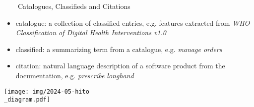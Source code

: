 \documentclass[aspectratio=1610,12pt]{beamer}
\newcommand{\imageslide}[4][]
{
\newgeometry{margin=0cm,top=1em}
\begin{frame}[plain]{~~~~#2}
\vspace{0.2em}
\centering\texttt{[image: \#3]}
\\#1
\note{#4}
\end{frame}
\restoregeometry
}
\begin{document}
{
\begin{frame}[plain]{~~~~Catalogues, Classifieds and Citations}
\begin{itemize}
\item catalogue: a collection of classified entries, e.g. features extracted from \emph{WHO Classification of Digital Health Interventions v1.0}
\item classified: a summarizing term from a catalogue, e.g. \emph{manage orders}
\item citation: natural language description of a software product from the documentation, e.g. \emph{prescribe longhand}
\end{itemize}
\centering\texttt{[image: img/2024-05-hito\\\_diagram.pdf]}
\end{frame}
\restoregeometry
}


\end{document}
